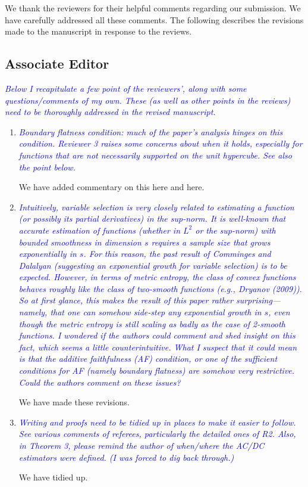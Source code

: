 \documentclass[pdftex,12pt]{article}
\def\reviewercomment#1{{\it\textcolor{blue}{#1}}\smallskip}
\begin{document}
\vspace*{5pt}

We thank the reviewers for their helpful comments regarding our
submission. We have carefully addressed all these comments. The
following describes the revisions made to the manuscript in response
to the reviews.

\subsection*{Associate Editor}

\reviewercomment{Below I recapitulate a few
point of the reviewers', along with some questions/comments of my own.
These (as well as other points in the reviews) need to be thoroughly
addressed in the revised manuscript.}

\begin{enumerate}
\item \reviewercomment{Boundary flatness condition: much of the paper's analysis hinges on
this condition.  Reviewer 3 raises some concerns about when it holds,
especially for functions that are not necessarily supported on the
unit hypercube.  See also the point below.}

We have added commentary on this here and here.

\item \reviewercomment{Intuitively, variable selection is very closely related to
estimating a function (or possibly its partial derivatives) in the
sup-norm.  It is well-known that accurate estimation of functions
(whether in $L^2$ or the sup-norm) with bounded smoothness in dimension
$s$ requires a sample size that grows exponentially in $s$.  For this
reason, the past result of Comminges and Dalalyan (suggesting an
exponential growth for variable selection) is to be expected.
However, in terms of metric entropy, the class of convex functions
behaves roughly like the class of two-smooth functions (e.g., Dryanov
(2009)).  So at first glance, this makes the result of this paper
rather surprising---namely, that one can somehow side-step any
exponential growth in $s$, even though the metric entropy is still
scaling as badly as the case of 2-smooth functions.  I wondered if the
authors could comment and shed insight on this fact, which seems a
little counterintuitive.  What I suspect that it could mean is that
the additive faithfulness (AF) condition, or one of the sufficient
conditions for AF (namely boundary flatness) are somehow very
restrictive.  Could the authors comment on these issues?}

We have made these revisions.

\item \reviewercomment{Writing and proofs need to be tidied up in places to make it easier
to follow.  See various comments of referees, particularly the
detailed ones of R2.  Also, in Theorem 3, please remind the author of
when/where the AC/DC estimators were defined.  (I was forced to dig
back through.)}

We have tidied up.

\end{enumerate}
\end{document}
